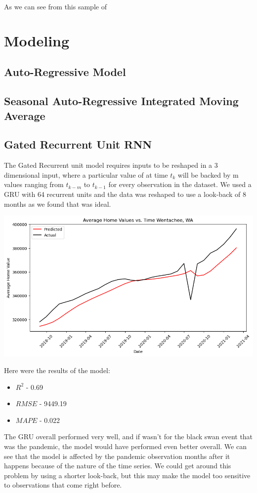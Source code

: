 \documentclass{article}
\begin{document}
	As we can see from this sample of 
	
	\section{Modeling}
	\subsection{Auto-Regressive Model}
	\subsection{Seasonal Auto-Regressive Integrated Moving Average}
	\subsection{Gated Recurrent Unit RNN}
	
	The Gated Recurrent unit model requires inputs to be reshaped in a 3 dimensional input, where a particular value of at time $t_k$ 
	will be backed by m values ranging from $t_{k-m}$ to $t_{k-1}$ for every observation in the dataset. We used a GRU with 64 recurrent units 
	and the data was reshaped to use a look-back of 8 months as we found that was ideal. 
	
	\includegraphics[scale = 0.5]{../plots/wentachee_1d_gru.png}
	
	Here were the results of the model: 
	
	\begin{itemize}
		\item $R^2$ - 0.69
		\item $RMSE$ - 9449.19
		\item $MAPE$ - 0.022
	\end{itemize}

	The GRU overall performed very well, and if wasn't for the black swan event that was the pandemic, the model would have performed even 
	better overall. We can see that the model is affected by the pandemic observation months after it happens because of the nature of the 
	time series. We could get around this problem by using a shorter look-back, but this may make the model too sensitive to observations that 
	come right before. 
	
\end{document}
